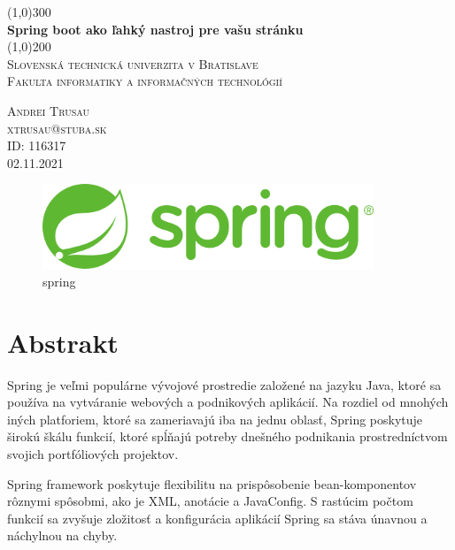 \documentclass[12pt, letterpaper]{article}
\begin{document}
\begin{titlepage}
	\begin{center}	
	\line(1,0){300} \\
	[0.25in]
	\huge{\bfseries \huge Spring boot ako ľahký nastroj pre vašu stránku} \\
	[2mm]
	\line(1,0){200} \\
	[2cm]
	\textsc{\large Slovenská technická univerzita v Bratislave \\ Fakulta informatiky a informačných technológií} \\
	[8cm]
	\end{center}
	\begin{flushright}
	\textsc{\large Andrei Trusau \\ xtrusau@stuba.sk\\ ID: 116317 \\ 02.11.2021 \\}
	\end{flushright}
	\newpage
\end{titlepage}

\begin{figure}[H]
	\centering
	\includegraphics[height=1in]{Spring_logo.png}
	\caption[Optional caption]{spring} %
\end{figure}

\tableofcontents
\thispagestyle{empty}
\cleardoublepage
\setcounter{page}{1}

\section{Abstrakt}\label{sec:intro}
Spring je veľmi populárne vývojové prostredie založené na jazyku Java, ktoré sa používa na vytváranie webových a podnikových aplikácií. Na rozdiel od mnohých iných platforiem, ktoré sa zameriavajú iba na jednu oblasť, Spring poskytuje širokú škálu funkcií, ktoré spĺňajú potreby dnešného podnikania prostredníctvom svojich portfóliových projektov.

Spring framework poskytuje flexibilitu na prispôsobenie bean-komponentov rôznymi spôsobmi, ako je XML, anotácie a JavaConfig. S rastúcim počtom funkcií sa zvyšuje zložitosť a konfigurácia aplikácií Spring sa stáva únavnou a náchylnou na chyby.
\end{document}

